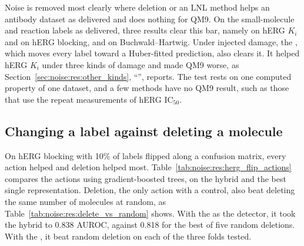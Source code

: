 Noise is removed most clearly where deletion or an LNL method helps an antibody dataset as delivered and does nothing for QM9. On the small-molecule and reaction labels as delivered, three results clear this bar, namely  on hERG $K_i$ and on hERG blocking, and  on Buchwald--Hartwig. Under injected damage, the , which moves every label toward a Huber-fitted prediction, also clears it. It helped hERG $K_i$ under three kinds of damage and made QM9 worse, as Section~\ref{sec:noise:res:other_kinds}, ``'', reports. The test rests on one computed property of one dataset, and a few methods have no QM9 result, such as those that use the repeat measurements of hERG IC$_{50}$.

\subsection{Changing a label against deleting a molecule}\label{sec:noise:res:action}

On hERG blocking with 10\% of labels flipped along a confusion matrix, every action helped and deletion helped most. Table~\ref{tab:noise:res:herg_flip_actions} compares the actions using gradient-boosted trees, on the hybrid and the best single representation. Deletion, the only action with a control, also beat deleting the same number of molecules at random, as Table~\ref{tab:noise:res:delete_vs_random} shows. With the  as the detector, it took the hybrid to 0.838 AUROC, against 0.818 for the best of five random deletions. With the , it beat random deletion on each of the three folds tested.

